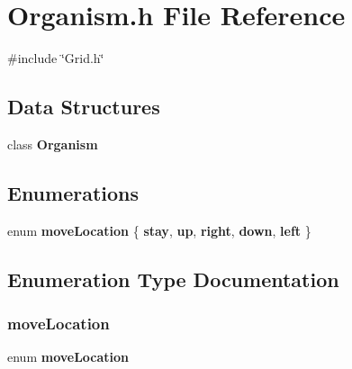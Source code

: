 \section{Organism.\+h File Reference}
\label{Organism_8h}
{\ttfamily \#include \char`\"{}Grid.\+h\char`\"{}}\newline
\subsection*{Data Structures}
\begin{DoxyCompactItemize}
\item 
class \textbf{ Organism}
\end{DoxyCompactItemize}
\subsection*{Enumerations}
\begin{DoxyCompactItemize}
\item 
enum \textbf{ move\+Location} \{ \newline
\textbf{ stay}, 
\textbf{ up}, 
\textbf{ right}, 
\textbf{ down}, 
\newline
\textbf{ left}
 \}
\end{DoxyCompactItemize}


\subsection{Enumeration Type Documentation}
\mbox{\label{Organism_8h_a1180da58c5ae24bd9bb85bbca98ed65e}} 
\subsubsection{move\+Location}
{\footnotesize\ttfamily enum \textbf{ move\+Location}}

